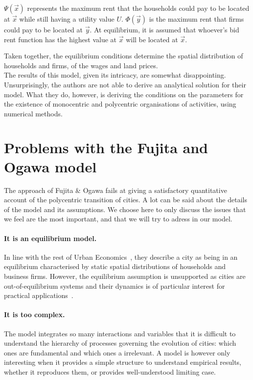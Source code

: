 $\Psi(\vec{x})$ represents the maximum rent that the households could pay to be
located at $\vec{x}$ while still having a utility value $U$. $\Phi(\vec{y})$ is
the maximum rent that firms could pay to be located at $\vec{y}$. At
equilibrium, it is assumed that whoever's bid rent function has the highest
value at $\vec{x}$ will be located at $\vec{x}$.

Taken together, the equilibrium conditions determine the spatial distribution of
households and firms, of the wages and land prices.\\

The results of this model, given its intricacy, are somewhat disappointing.
Unsurprisingly, the authors are not able to derive an analytical solution for
their model. What they do, however, is deriving the conditions on the parameters
for the existence of monocentric and polycentric organisations of activities,
using numerical methods.

\section{Problems with the Fujita and Ogawa model}
\label{sec:problems_with_the_fujita_and_ogawa_model}

The approach of Fujita \& Ogawa fails at giving a satisfactory quantitative account  of the
polycentric transition of cities. A lot can be said about the details of the
model and its assumptions. We choose here to only discuss the issues that we
feel are the most important, and that we will try to adress in our model. 

\paragraph{It is an equilibrium model.} In line with the rest of Urban
Economics~\cite{Fujita:2001, Fujita:2013}, they describe a city as being in
an equilibrium characterised by static spatial distributions of households and
business firms. However, the equilibrium assumption is unsupported as cities are
out-of-equilibrium systems and their dynamics is of particular interest for
practical applications~\cite{Batty:2008}.\\

\paragraph{It is too complex.} The model integrates so many interactions and
variables that it is difficult to understand the hierarchy of processes
governing the evolution of cities: which ones are fundamental and which ones a
irrelevant. A model is however only interesting when it  
provides a simple structure to understand empirical results, whether it
reproduces them, or provides well-understood limiting case.

